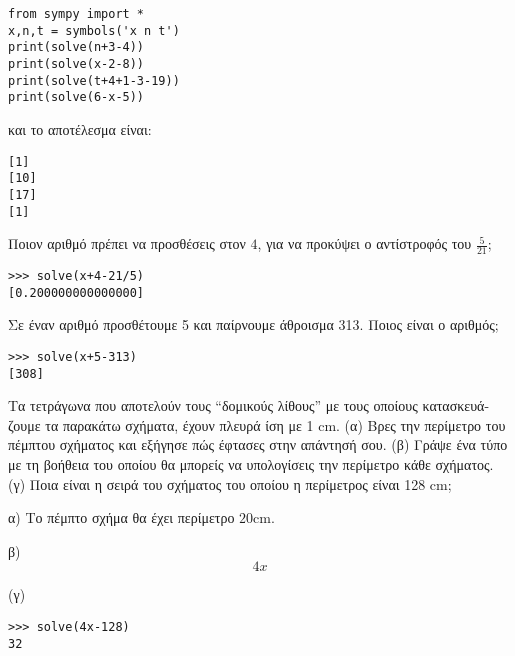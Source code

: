 \begin{lstlisting}
from sympy import *
x,n,t = symbols('x n t')
print(solve(n+3-4))
print(solve(x-2-8))
print(solve(t+4+1-3-19))
print(solve(6-x-5))
\end{lstlisting}
και το αποτέλεσμα είναι:
\begin{lstlisting}
[1]
[10]
[17]
[1]
\end{lstlisting}

\begin{exercise}
Ποιον αριθμό πρέπει να προσθέσεις στον $4$, για να προκύψει ο αντίστροφός του 
$\frac{5}{21}$;
\end{exercise}
\begin{lstlisting}
>>> solve(x+4-21/5)
[0.200000000000000]
\end{lstlisting}
\begin{exercise}
Σε έναν αριθμό προσθέτουμε 5 και παίρνουμε άθροισμα 313. Ποιος είναι ο αριθμός;
\end{exercise}
\begin{lstlisting}
>>> solve(x+5-313)
[308]
\end{lstlisting}
\begin{exercise}
Τα τετράγωνα που αποτελούν τους “δομικούς λίθους” με τους οποίους κατασκευά-
ζουμε τα παρακάτω σχήματα, έχουν πλευρά ίση με 1 cm.
(α) Bρες την περίμετρο του πέμπτου σχήματος και εξήγησε πώς έφτασες στην απάντησή σου.
(β) Γράψε ένα τύπο με τη βοήθεια του οποίου θα μπορείς να υπολογίσεις την περίμετρο κάθε σχήματος.
(γ) Ποια είναι η σειρά του σχήματος του οποίου η περίμετρος είναι 128 cm;
\end{exercise}

α) Το πέμπτο σχήμα θα έχει περίμετρο $20$cm.

β) $$4x$$

(γ) 
\begin{lstlisting}
>>> solve(4x-128)
32
\end{lstlisting}
